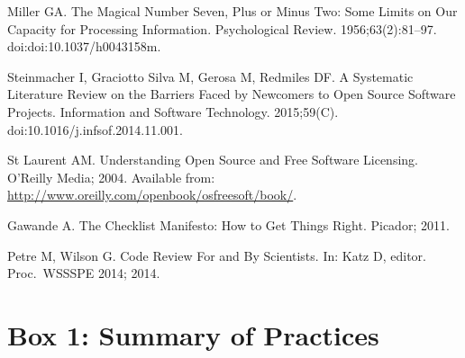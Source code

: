 \documentclass[10pt,letterpaper]{article}
\begin{document}
\begin{thebibliography}{10}
Miller GA.
\newblock The Magical Number Seven, Plus or Minus Two: Some Limits on Our
  Capacity for Processing Information.
\newblock Psychological Review. 1956;63(2):81–97.
\newblock doi:{doi:10.1037/h0043158m}.

Steinmacher I, {Graciotto Silva} M, Gerosa M, Redmiles DF.
\newblock A Systematic Literature Review on the Barriers Faced by Newcomers to
  Open Source Software Projects.
\newblock Information and Software Technology. 2015;59(C).
\newblock doi:{10.1016/j.infsof.2014.11.001}.

{St  Laurent} AM.
\newblock Understanding Open Source and Free Software Licensing.
\newblock O'Reilly Media; 2004.
\newblock Available from:
  \url{http://www.oreilly.com/openbook/osfreesoft/book/}.

Gawande A.
\newblock The Checklist Manifesto: How to Get Things Right.
\newblock Picador; 2011.

Petre M, Wilson G.
\newblock Code Review For and By Scientists.
\newblock In: Katz D, editor. Proc.\ WSSSPE 2014; 2014.

\end{thebibliography}

\pagebreak

\section*{Box 1: Summary of Practices}
\end{document}
